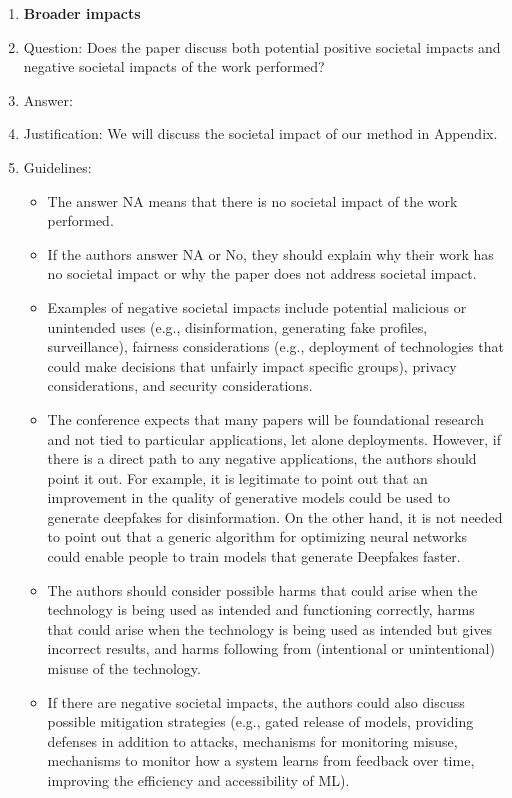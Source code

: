 \documentclass{article}
\begin{document}
\begin{enumerate}
\item {\bf Broader impacts}
    \item[] Question: Does the paper discuss both potential positive societal impacts and negative societal impacts of the work performed?
    \item[] Answer: \answerYes{} %
    \item[] Justification: We will discuss the societal impact of our method in Appendix.
    \item[] Guidelines:
    \begin{itemize}
        \item The answer NA means that there is no societal impact of the work performed.
        \item If the authors answer NA or No, they should explain why their work has no societal impact or why the paper does not address societal impact.
        \item Examples of negative societal impacts include potential malicious or unintended uses (e.g., disinformation, generating fake profiles, surveillance), fairness considerations (e.g., deployment of technologies that could make decisions that unfairly impact specific groups), privacy considerations, and security considerations.
        \item The conference expects that many papers will be foundational research and not tied to particular applications, let alone deployments. However, if there is a direct path to any negative applications, the authors should point it out. For example, it is legitimate to point out that an improvement in the quality of generative models could be used to generate deepfakes for disinformation. On the other hand, it is not needed to point out that a generic algorithm for optimizing neural networks could enable people to train models that generate Deepfakes faster.
        \item The authors should consider possible harms that could arise when the technology is being used as intended and functioning correctly, harms that could arise when the technology is being used as intended but gives incorrect results, and harms following from (intentional or unintentional) misuse of the technology.
        \item If there are negative societal impacts, the authors could also discuss possible mitigation strategies (e.g., gated release of models, providing defenses in addition to attacks, mechanisms for monitoring misuse, mechanisms to monitor how a system learns from feedback over time, improving the efficiency and accessibility of ML).
    \end{itemize}
    

\end{enumerate}
\end{document}
